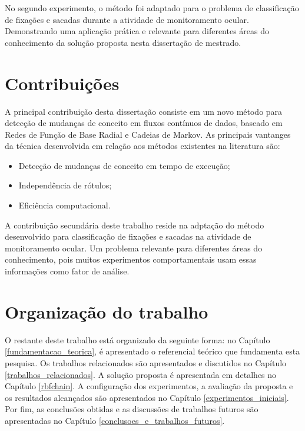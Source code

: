 \documentclass[msc, classic, a4paper]{ufbathesis}
\begin{document}
No segundo experimento,
o método foi adaptado para o problema de classificação de fixações e sacadas durante a atividade de monitoramento ocular.
Demonstrando uma aplicação prática e relevante para diferentes áreas do conhecimento da solução proposta nesta dissertação de mestrado.

\section{Contribuições}

A principal contribuição desta dissertação consiste em um novo método para detecção de mudanças de conceito em fluxos contínuos de dados,
baseado em Redes de Função de Base Radial e Cadeias de Markov.
%
As principais vantanges da técnica desenvolvida em relação aos métodos existentes na literatura são:

\begin{itemize}
    \item Detecção de mudanças de conceito em tempo de execução;
    \item Independência de rótulos;
    \item Eficiência computacional.
\end{itemize}

A contribuição secundária deste trabalho reside na adptação do método desenvolvido para classificação de fixações e sacadas na atividade de monitoramento ocular.
Um problema relevante para diferentes áreas do conhecimento,
pois muitos experimentos comportamentais usam essas informações como fator de análise.

\section{Organização do trabalho}

O restante deste trabalho está organizado da seguinte forma:
%
no Capítulo \ref{fundamentacao_teorica}, é apresentado o referencial teórico que fundamenta esta pesquisa.
Os trabalhos relacionados são apresentados e discutidos no Capítulo \ref{trabalhos_relacionados}.
A solução proposta é apresentada em detalhes no Capítulo \ref{rbfchain}.
A configuração dos experimentos, a avaliação da proposta e os resultados alcançados são apresentados no Capítulo \ref{experimentos_iniciais}.
Por fim, as conclusões obtidas e as discussões de trabalhos futuros são apresentadas no Capítulo \ref{conclusoes_e_trabalhos_futuros}.

 \label{fundamentacao_teorica}
\end{document}
